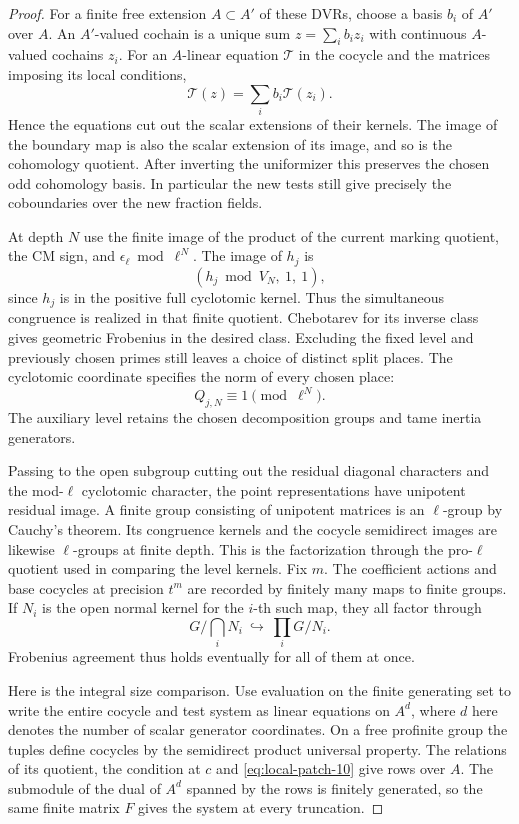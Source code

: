 \begin{proof}
For a finite free extension \(A\subset A'\) of these
DVRs, choose a basis \(b_i\) of \(A'\) over \(A\).
An \(A'\)-valued cochain is a unique sum \(z=\sum_i b_i z_i\)
with continuous \(A\)-valued cochains \(z_i\). For an \(A\)-linear
equation \(\mathcal T\) in the cocycle and the matrices imposing its local conditions,
\[
       \mathcal T(z)=\sum_i b_i \mathcal T(z_i).
\]
Hence the equations cut out the scalar extensions of their
kernels. The image of the boundary map is also the scalar
extension of its image, and so is the cohomology quotient.
After inverting the uniformizer this preserves the chosen odd
cohomology basis. In particular the new tests still give precisely
the coboundaries over the new fraction fields.

At depth \(N\) use the finite image of the product
of the current marking quotient, the CM sign, and
\(\epsilon_\ell\bmod\ell^N\). The image of \(h_j\) is
\[
            (h_j\bmod V_N,\ 1,\ 1),
\]
since \(h_j\) is in the positive full cyclotomic kernel.
Thus the simultaneous congruence is realized in that
finite quotient. Chebotarev for its inverse class gives
geometric Frobenius in the desired class. Excluding the
fixed level and previously chosen primes still leaves a
choice of distinct split places. The cyclotomic coordinate specifies the norm of every chosen place: 
\[
 Q_{j,N}\equiv1\pmod{\ell^N}.
\]
 The auxiliary
level retains the chosen decomposition groups and tame
inertia generators.

Passing to the open subgroup cutting
out the residual diagonal characters and the mod-\(\ell\)
cyclotomic character, the point representations have
unipotent residual image. A finite group consisting of
unipotent matrices is an \(\ell\)-group by Cauchy's theorem.
Its congruence kernels and the cocycle semidirect images
are likewise \(\ell\)-groups at finite depth. This is the
factorization through the pro-\(\ell\) quotient used in
comparing the level kernels. Fix \(m\). The coefficient actions and base cocycles at precision \(t^m\) are recorded by finitely many maps to finite groups. If \(N_i\) is the open normal kernel for the \(i\)-th such map, they all factor through
\[
 G/\bigcap_i N_i\ \hookrightarrow\ \prod_i G/N_i .
\] Frobenius agreement thus holds eventually
for all of them at once.

Here is the integral size comparison. Use evaluation on the
finite generating set to write the entire cocycle and test
system as linear equations on \(A^d\), where \(d\) here denotes
the number of scalar generator coordinates. On a free
profinite group the tuples define cocycles by the
semidirect product universal property. The relations of its
quotient, the condition at \(c\) and \eqref{eq:local-patch-10} give rows over
\(A\). The submodule of the dual of \(A^d\) spanned by the
rows is finitely generated, so the same finite matrix
\(F\) gives the system at every truncation.


\end{proof}
